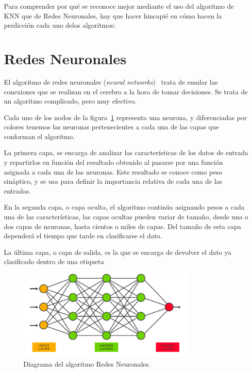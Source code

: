 \documentclass[a4paper, 12pt]{book}
\begin{document}
Para comprender por qué se reconoce mejor mediante el uso del algoritmo de KNN que de Redes Neuronales, hay que hacer hincapié en cómo hacen la predicción cada uno delos algoritmos:

\section*{Redes Neuronales}
\label{sec:neural-networks}

El algoritmo de redes neuronales (\textit{neural networks})~\cite{izaurieta2000redes} trata de emular las conexiones que se realizan en el cerebro a la hora de tomar decisiones. Se trata de un algoritmo complicado, pero muy efectivo.

Cada uno de los nodos de la figura~\ref{fig:neural-networks-diagram} representa una neurona, y diferenciadas por colores tenemos las neuronas pertenecientes a cada una de las capas que conforman el algoritmo.

La primera capa, se encarga de analizar las características de los datos de entrada y repartirlos en función del resultado obtenido al pasarse por una función asignada a cada una de las neuronas. Este resultado se conoce como peso sináptico, y se usa para definir la importancia relativa de cada una de las entradas.

En la segunda capa, o capa oculta, el algoritmo continúa asignando pesos a cada una de las características, las capas ocultas pueden variar de tamaño, desde una o dos capas de neuronas, hasta cientos o miles de capas. Del tamaño de esta capa dependerá el tiempo que tarde en clasificarse el dato.

La última capa, o capa de salida, es la que se encarga de devolver el dato ya clasificado dentro de una etiqueta

\begin{figure}
	\centering
	\includegraphics[width=9cm]{img/neutral-network-diagram.png}
	\caption{Diagrama del algoritmo Redes Neuronales.}\label{fig:neural-networks-diagram}
\end{figure}
\end{document}

